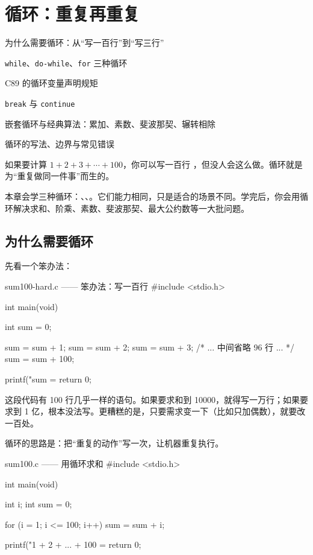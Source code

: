 \chapter{循环：重复再重复}

\begin{introduction}
  \item 为什么需要循环：从“写一百行”到“写三行”
  \item \texttt{while}、\texttt{do-while}、\texttt{for} 三种循环
  \item C89 的循环变量声明规矩
  \item \texttt{break} 与 \texttt{continue}
  \item 嵌套循环与经典算法：累加、素数、斐波那契、辗转相除
  \item 循环的写法、边界与常见错误
\end{introduction}


如果要计算 $1+2+3+\cdots+100$，你可以写一百行 ，但没人会这么做。循环就是为“重复做同一件事”而生的。

本章会学三种循环：、、。它们能力相同，只是适合的场景不同。学完后，你会用循环解决求和、阶乘、素数、斐波那契、最大公约数等一大批问题。

\section{为什么需要循环}

先看一个笨办法：

\begin{codebox}{sum100-hard.c —— 笨办法：写一百行}
#include <stdio.h>

int main(void)
{
    int sum = 0;

    sum = sum + 1;
    sum = sum + 2;
    sum = sum + 3;
    /* ... 中间省略 96 行 ... */
    sum = sum + 100;

    printf("sum = %
    return 0;
}
\end{codebox}

这段代码有 100 行几乎一样的语句。如果要求和到 10000，就得写一万行；如果要求到 1 亿，根本没法写。更糟糕的是，只要需求变一下（比如只加偶数），就要改一百处。

循环的思路是：把“重复的动作”写一次，让机器重复执行。

\begin{codebox}{sum100.c —— 用循环求和}
#include <stdio.h>

int main(void)
{
    int i;
    int sum = 0;

    for (i = 1; i <= 100; i++) {
        sum = sum + i;
    }

    printf("1 + 2 + ... + 100 = %
    return 0;
}
\end{codebox}

